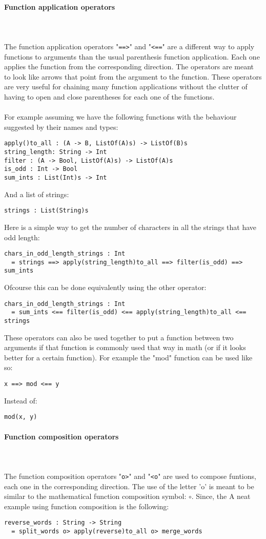 \documentclass{article}
\def\pend{\mbox{} \\\\}
\begin{document}
\paragraph{Function application operators}\pend
The function application operators "\texttt{==>}" and "\texttt{<==}" are a different
way to apply functions to arguments than the usual parenthesis function application.
Each one applies the function from the corresponding direction. The operators are 
meant to look like arrows that point from the argument to the function.
These operators are very useful for chaining many function applications without the
clutter of having to open and close parentheses for each one of the functions.\\\\
For example assuming we have the following functions with the behaviour suggested
by their names and types:
\begin{verbatim}
apply()to_all : (A -> B, ListOf(A)s) -> ListOf(B)s
string_length: String -> Int
filter : (A -> Bool, ListOf(A)s) -> ListOf(A)s
is_odd : Int -> Bool
sum_ints : List(Int)s -> Int
\end{verbatim}
And a list of strings:
\begin{verbatim}
strings : List(String)s
\end{verbatim}
Here is a simple way to get the number of characters in all the strings that have 
odd length:
\begin{verbatim}
chars_in_odd_length_strings : Int
  = strings ==> apply(string_length)to_all ==> filter(is_odd) ==> sum_ints
\end{verbatim}
Ofcourse this can be done equivalently using the other operator:
\begin{verbatim}
chars_in_odd_length_strings : Int
  = sum_ints <== filter(is_odd) <== apply(string_length)to_all <== strings
\end{verbatim}
These operators can also be used together to put a function between two arguments
if that function is commonly used that way in math (or if it looks better for a
certain function). For example the "mod" function can be used like so:
\begin{verbatim}
x ==> mod <== y
\end{verbatim}
Instead of:
\begin{verbatim}
mod(x, y)
\end{verbatim}

\paragraph{Function composition operators}\pend
The function composition operators "\texttt{o>}" and "\texttt{<o}" are used to 
compose funtions, each one in the corresponding direction. The use of the letter 'o'
is meant to be similar to the mathematical function composition symbol: \(\circ\).
Since, the 
A neat example using function composition is the following:
\begin{verbatim}
reverse_words : String -> String
  = split_words o> apply(reverse)to_all o> merge_words
\end{verbatim}
\end{document}
